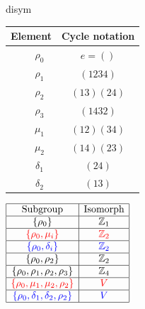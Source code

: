 \begin{examples}{}{disym}
\begin{enumerate}
			
	\begin{minipage}[t]{\linewidth}\vspace{0pt}
		\begin{minipage}[t]{.3\linewidth}\vspace{0pt}
			\def\arraystretch{1.1}
			\begin{tabular}{|r|c|c|}\hline
		    \multicolumn{2}{|c|}{Element} & Cycle notation\\\hline
		    & $\rho_0$ & $e=()$\\\cline{2-3}
		    \multirow{2}{*}{\rotatebox{90}{\smash[b]{\makebox[0cm]{\ Rotations}}}} & $\rho_1$ & $(1234)$\\\cline{2-3}
		    & $\rho_2$ & $(13)(24)$\\\cline{2-3}
		    & $\rho_3$ & $(1432)$\\\hline
		    & $\mu_1$ & $(12)(34)$\\\cline{2-3}
		    \multirow{2}{*}{\rotatebox{90}{\smash[b]{\makebox[0cm]{\ \,Reflections}}}} & $\mu_2$ & $(14)(23)$\\\cline{2-3}
		    & $\delta_1$ & $(24)$\\\cline{2-3}
		    & $\delta_2$ & $(13)$\\\hline
		  \end{tabular}
		\end{minipage}
		\hfill
		\begin{minipage}[t]{.3\linewidth}\vspace{0pt}
		  \def\arraystretch{1.1}
		  $\begin{array}{|c|c|c|}\hline
		    \text{Subgroup} & \text{Isomorph}\\\hline
		     \{\rho_0\} & \mathbb{Z}_1\\\hline
		     \textcolor{red}{\{\rho_0,\mu_i\}} & \textcolor{red}{\mathbb{Z}_2}\\\hline
		     \textcolor{blue}{\{\rho_0,\delta_i\}} & \textcolor{blue}{\mathbb{Z}_2}\\\hline
		     \{\rho_0,\rho_2\} & \mathbb{Z}_2\\\hline
		     \{\rho_0,\rho_1,\rho_2,\rho_3\} & \mathbb{Z}_4\\\hline
		     \textcolor{red}{\{\rho_0,\mu_1,\mu_2,\rho_2\}} & \textcolor{red}{V}\\\hline
		     \textcolor{blue}{\{\rho_0,\delta_1,\delta_2,\rho_2\}} & \textcolor{blue}{V}\\\hline
		  \end{array}$
		\end{minipage}
		\hfill
		\begin{minipage}[t]{.31\linewidth}\vspace{0pt}

\end{minipage}
\end{minipage}
\end{enumerate}
\end{examples}
